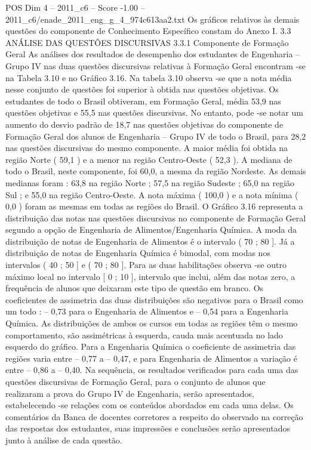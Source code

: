 \begin{textsample}{POS Dim 4 – 2011\_c6 – Score -1.00 – 2011\_c6/enade\_2011\_eng\_g\_4\_974c613aa2.txt}
Os gráficos relativos às demais questões do componente de Conhecimento Específico constam do Anexo I. 3.3 ANÁLISE DAS QUESTÕES DISCURSIVAS 3.3.1 Componente de Formação Geral As análises dos resultados de desempenho dos estudantes de Engenharia – Grupo IV nas duas questões discursivas relativas à Formação Geral encontram -se na Tabela 3.10 e no Gráfico 3.16.
Na tabela 3.10 observa -se que a nota média nesse conjunto de questões foi superior à obtida nas questões objetivas.
Os estudantes de todo o Brasil obtiveram, em Formação Geral, média 53,9 nas questões objetivas e 55,5 nas questões discursivas.
No entanto, pode -se notar um aumento do desvio padrão de 18,7 nas questões objetivas do componente de Formação Geral dos alunos de Engenharia – Grupo IV de todo o Brasil, para 28,2 nas questões discursivas do mesmo componente.
A maior média foi obtida na região Norte ( 59,1 ) e a menor na região Centro-Oeste ( 52,3 ).
A mediana de todo o Brasil, neste componente, foi 60,0, a mesma da região Nordeste.
As demais medianas foram : 63,8 na região Norte ; 57,5 na região Sudeste ; 65,0 na região Sul ; e 55,0 na região Centro-Oeste.
A nota máxima ( 100,0 ) e a nota mínima ( 0,0 ) foram as mesmas em todas as regiões do Brasil.
O Gráfico 3.16 representa a distribuição das notas nas questões discursivas no componente de Formação Geral segundo a opção de Engenharia de Alimentos/Engenharia Química.
A moda da distribuição de notas de Engenharia de Alimentos é o intervalo ( 70 ; 80 ].
Já a distribuição de notas de Engenharia Química é bimodal, com modas nos intervalos ( 40 ; 50 ] e ( 70 ; 80 ].
Para as duas habilitações observa -se outro máximo local no intervalo [ 0 ; 10 ], intervalo que inclui, além das notas zero, a frequência de alunos que deixaram este tipo de questão em branco.
Os coeficientes de assimetria das duas distribuições são negativos para o Brasil como um todo : – 0,73 para o Engenharia de Alimentos e – 0,54 para a Engenharia Química.
As distribuições de ambos os cursos em todas as regiões têm o mesmo comportamento, são assimétricas à esquerda, cauda mais acentuada no lado esquerdo do gráfico.
Para a Engenharia Química o coeficiente de assimetria das regiões varia entre – 0,77 a – 0,47, e para Engenharia de Alimentos a variação é entre – 0,86 a – 0,40.
Na sequência, os resultados verificados para cada uma das questões discursivas de Formação Geral, para o conjunto de alunos que realizaram a prova do Grupo IV de Engenharia, serão apresentados, estabelecendo -se relações com os conteúdos abordados em cada uma delas.
Os comentários da Banca de docentes corretores a respeito do observado na correção das respostas dos estudantes, suas impressões e conclusões serão apresentados junto à análise de cada questão.

\end{textsample}
